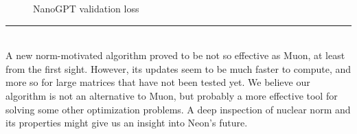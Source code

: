 \documentclass[a1]{a1poster}
\def\Head#1{\noindent{\LARGE\color{bluegray} #1}\bigskip}
\begin{document}
\begin{textblock}{7.0}
\begin{figure}[h]
    \caption{NanoGPT validation loss}
    \label{fig:nanogpt_val_loss}
\end{figure}
\medskip
\hrule\medskip
\Head{Conclusion}\\
A new norm-motivated algorithm proved to be not so effective as Muon, at least from the first sight. However, its updates seem to be much faster to compute, and more so for large matrices that have not been tested yet. We believe our algorithm is not an alternative to Muon, but probably a more effective tool for solving some other optimization problems. A deep inspection of nuclear norm and its properties might give us an insight into Neon's future.

\medskip

\end{textblock}
\end{document}
